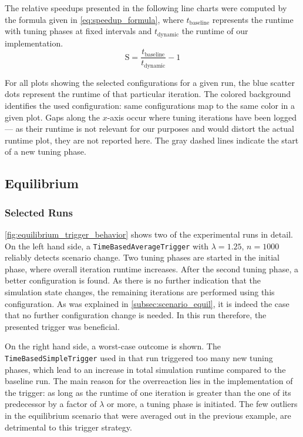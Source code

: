 The relative speedups presented in the following line charts were computed by the formula given in \eqref{eq:speedup_formula}, where $t_\text{baseline}$ represents the runtime with tuning phases at fixed intervals and $t_\text{dynamic}$ the runtime of our implementation.
\begin{equation}
	\text{S}=\frac{t_\text{baseline}}{t_\text{dynamic}}-1\label{eq:speedup_formula}
\end{equation}

For all plots showing the selected configurations for a given run, the blue scatter dots represent the runtime of that particular iteration. The colored background identifies the used configuration: same configurations map to the same color in a given plot. Gaps along the $x$-axis occur where tuning iterations have been logged --- as their runtime is not relevant for our purposes and would distort the actual runtime plot, they are not reported here. The gray dashed lines indicate the start of a new tuning phase.


\subsection{Equilibrium}
\subsubsection{Selected Runs}
\autoref{fig:equilibrium_trigger_behavior} shows two of the experimental runs in detail.
On the left hand side, a \texttt{TimeBasedAverageTrigger} with $\lambda=1.25$, $n=1000$ reliably detects scenario change. Two tuning phases are started in the initial phase, where overall iteration runtime increases. After the second tuning phase, a better configuration is found. As there is no further indication that the simulation state changes, the remaining iterations are performed using this configuration. As was explained in \autoref{subsec:scenario_equil}, it is indeed the case that no further configuration change is needed. In this run therefore, the presented trigger was beneficial.

On the right hand side, a worst-case outcome is shown. The \texttt{TimeBasedSimpleTrigger} used in that run triggered too many new tuning phases, which lead to an increase in total simulation runtime compared to the baseline run. The main reason for the overreaction lies in the implementation of the trigger: as long as the runtime of one iteration is greater than the one of its predecessor by a factor of $\lambda$ or more, a tuning phase is initiated. The few outliers in the equilibrium scenario that were averaged out in the previous example, are detrimental to this trigger strategy.


